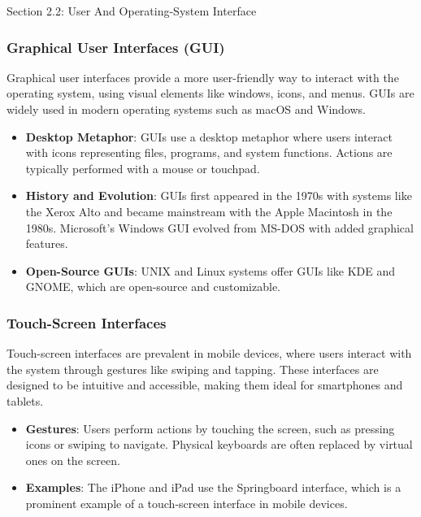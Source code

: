 \begin{notes}{Section 2.2: User And Operating-System Interface}
    \subsubsection*{Graphical User Interfaces (GUI)}
    
    Graphical user interfaces provide a more user-friendly way to interact with the operating system, using visual elements like windows, icons, and menus. GUIs are widely used in modern operating 
    systems such as macOS and Windows.
    
    \begin{highlight}
    
    \begin{itemize}
        \item \textbf{Desktop Metaphor}: GUIs use a desktop metaphor where users interact with icons representing files, programs, and system functions. Actions are typically performed with a mouse or touchpad.
        \item \textbf{History and Evolution}: GUIs first appeared in the 1970s with systems like the Xerox Alto and became mainstream with the Apple Macintosh in the 1980s. Microsoft's Windows GUI 
        evolved from MS-DOS with added graphical features.
        \item \textbf{Open-Source GUIs}: UNIX and Linux systems offer GUIs like KDE and GNOME, which are open-source and customizable.
    \end{itemize}
    
    \end{highlight}
    
    \subsubsection*{Touch-Screen Interfaces}
    
    Touch-screen interfaces are prevalent in mobile devices, where users interact with the system through gestures like swiping and tapping. These interfaces are designed to be intuitive and accessible, 
    making them ideal for smartphones and tablets.
    
    \begin{highlight}
    
    \begin{itemize}
        \item \textbf{Gestures}: Users perform actions by touching the screen, such as pressing icons or swiping to navigate. Physical keyboards are often replaced by virtual ones on the screen.
        \item \textbf{Examples}: The iPhone and iPad use the Springboard interface, which is a prominent example of a touch-screen interface in mobile devices.
    \end{itemize}
    

\end{highlight}
\end{notes}
